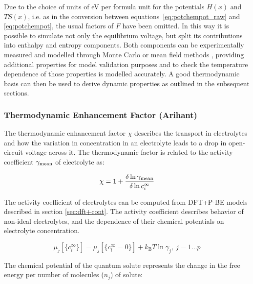 \documentclass[journal=jacsat,manuscript=article]{achemso}
\newcommand*{\cif}{c_i^{\infty}}
\newcommand*{\kb}{k_{\textrm{B}}}
\newcommand*{\pbe}{P-BE}
\begin{document}
Due to the choice of units of eV per formula unit for the potentials $H(x)$ and $TS(x)$, i.e. as in the conversion between equations~\ref{eq:potchempot_raw} and \ref{eq:potchempot}, the usual factors of $F$ have been omitted. In this way it is possible to simulate not only the equilibrium voltage, but split its contributions into enthalpy and entropy components. Both components can be experimentally measured \cite{schlueter_quantifying_2018,Mercer2019,THOMAS2003844,Reynier2004,Yazami_2006} and modelled through Monte Carlo or mean field methods \cite{schlueter_quantifying_2018,mercer_influence_2017,Mercer2019,GavilanArriazu2017}, providing additional properties for model validation purposes and to check the temperature dependence of those properties is modelled accurately. A good thermodynamic basis can then be used to derive dynamic properties as outlined in the subsequent sections.

\subsubsection{Thermodynamic Enhancement Factor (Arihant)}
\label{sec:tf}
The thermodynamic enhancement factor $\chi$ describes the transport in electrolytes and how the variation in concentration in an electrolyte leads to a drop in open-circuit voltage across it.\cite{Stewart2008, wang2020} The thermodynamic factor is related to the activity coefficient $\gamma_{\rm mean}$ of electrolyte as:

\begin{equation}
    \label{eq:tf}
    \chi = 1+\frac{\delta \ln \gamma_{\rm mean}}{\delta \ln \cif}
\end{equation}

The activity coefficient of electrolytes can be computed from DFT+\pbe{} models described in section \ref{sec:dft+cont}.\cite{Ringe2016, Dziedzic2020} The activity coefficient describes behavior of non-ideal electrolytes, and the dependence of their chemical potentials on electrolyte concentration.\cite{Atkins2014}

\begin{equation}
    \label{eq:mujid}
    \mu_j\left[\{\cif\}\right]=\mu_j\left[\{\cif=0\}\right]+ \kb T\ln{\gamma_j},  \ j=1\dots p
\end{equation}

The chemical potential of the quantum solute represents the change in the free energy per number of molecules ($n_j$) of solute:
\end{document}
